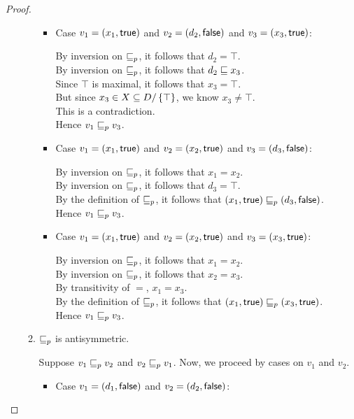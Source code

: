 \begin{proof}
\begin{enumerate}
\begin{enumerate}
\begin{itemize}
  \item Case $v_1 = (x_1, \textsf{true})$ and $v_2 = (d_2, \textsf{false})$ and $v_3 = (x_3, \textsf{true})$:

    By inversion on $\sqsubseteq_p$, it follows that $d_2 = \top$. \\ 
    By inversion on $\sqsubseteq_p$, it follows that $d_2 \sqsubseteq x_3$. \\ 
    Since $\top$ is maximal, it follows that $x_3 = \top$. \\
    But since $x_3 \in X \subseteq D/\left\{\top\right\}$, we know $x_3 \not= \top$. \\ 
    This is a contradiction. \\
    Hence $v_1 \sqsubseteq_p v_3$. 


  \item Case $v_1 = (x_1, \textsf{true})$ and $v_2 = (x_2, \textsf{true})$ and $v_3 = (d_3, \textsf{false})$:

    By inversion on $\sqsubseteq_p$, it follows that $x_1 = x_2$. \\ 
    By inversion on $\sqsubseteq_p$, it follows that $d_3 = \top$. \\ 
    By the definition of $\sqsubseteq_p$, it follows that $(x_1, \textsf{true}) \sqsubseteq_p (d_3, \textsf{false})$. \\ 
    Hence $v_1 \sqsubseteq_p v_3$. 

  \item Case $v_1 = (x_1, \textsf{true})$ and $v_2 = (x_2, \textsf{true})$ and $v_3 = (x_3, \textsf{true})$:

    By inversion on $\sqsubseteq_p$, it follows that $x_1 = x_2$. \\ 
    By inversion on $\sqsubseteq_p$, it follows that $x_2 = x_3$. \\ 
    By transitivity of $=$, $x_1 = x_3$. \\ 
    By the definition of $\sqsubseteq_p$, it follows that $(x_1, \textsf{true}) \sqsubseteq_p (x_3, \textsf{true})$. \\ 
    Hence $v_1 \sqsubseteq_p v_3$. 
    
  \end{itemize}

\item $\sqsubseteq_p$ is antisymmetric. 

  Suppose $v_1 \sqsubseteq_p v_2$ and $v_2 \sqsubseteq_p v_1$. Now, we proceed by cases on $v_1$ and $v_2$. 
  \begin{itemize}
  \item Case $v_1 = (d_1, \textsf{false})$ and $v_2 = (d_2, \textsf{false})$: 
    

\end{itemize}
\end{enumerate}
\end{enumerate}
\end{proof}
